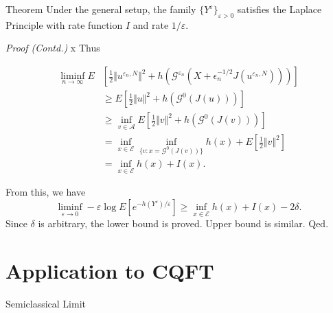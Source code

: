 \documentclass{if-beamer}
\begin{document}
\begin{frame}
    \begin{block}{Theorem}
        Under the general setup, the family $\{Y^{\varepsilon}\}_{\varepsilon > 0}$ satisfies the Laplace Principle with rate function $I$ and rate $1/ \varepsilon$.
    \end{block}
    \textit{Proof (Contd.)} 
 x    Thus

    \begin{align*}
        \liminf_{n \to \infty} E &\left[ 
            \frac{1}{2} \Vert u^{\varepsilon_n, N} \Vert^2 + h\left( \mathcal{G}^{\varepsilon_n}(X + \epsilon_n^{-1/2} J(u^{\varepsilon_n, N})) \right) \right] \\
        &\geq E\left[ \frac{1}{2} \Vert u \Vert^2 + h\left( \mathcal{G}^0(J(u)) \right) \right] \\
        &\geq \inf_{v \in \mathscr{A}} E\left[ \frac{1}{2} \Vert v \Vert^2 + h\left( \mathcal{G}^0(J(v)) \right) \right]\\
        &= \inf_{x \in \mathcal{E}} \inf_{ \{ v : x = \mathcal{G}^0(J(v)) \} } h(x) + E \left[ \frac{1}{2} \Vert v \Vert^2 \right] \\
        &= \inf_{x \in \mathcal{E}} h(x) + I(x).
    \end{align*}

    From this, we have
    \[
        \liminf_{\varepsilon \to 0} -\varepsilon \log E\left[ e^{- h(Y^{\varepsilon}) / \varepsilon} \right] \geq
        \inf_{x \in \mathcal{E}} h(x) + I(x) - 2 \delta.
    \]
    Since $\delta$ is arbitrary, the lower bound is proved. Upper bound is similar. Qed.
\end{frame}




\section{Application to CQFT}

\begin{frame}{Semiclassical Limit}
    
\end{frame}
\end{document}
